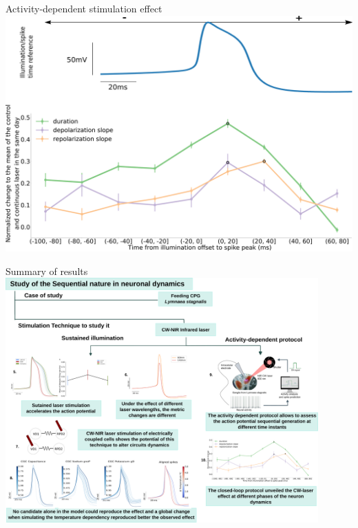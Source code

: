 \documentclass[aspectratio=43]{beamer}
\begin{document}
\begin{frame}{Activity-dependent stimulation effect}
	\centering
	\includegraphics[width=\textwidth]{Images/activity-dependent results.png}
\end{frame}

\begin{frame}{Summary of results}
	\centering
	\includegraphics[width=0.9\textwidth]{Images/laser_summary.png}
\end{frame}
\end{document}
